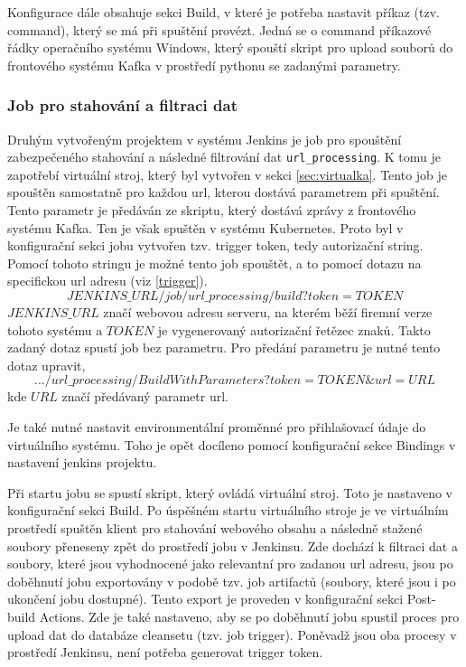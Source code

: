 \documentclass[thesis=M,czech,hidelinks]{FITthesis}[2013/05/06]
\begin{document}
Konfigurace dále obsahuje sekci Build, v které je potřeba nastavit příkaz (tzv. command), který se má při spuštění provézt. Jedná se o command příkazové řádky operačního systému Windows, který spouští skript pro upload souborů do frontového systému Kafka v prostředí pythonu se zadanými parametry.



\subsubsection{Job pro stahování a filtraci dat} \label{sec:jenkinsvirt}
Druhým vytvořeným projektem v systému Jenkins je job pro spouštění zabezpečeného stahování a následné filtrování dat \texttt{url_processing}. K tomu je zapotřebí virtuální stroj, který byl vytvořen v sekci \ref{sec:virtualka}. Tento job je spouštěn samostatně pro každou url, kterou dostává parametrem při spuštění. Tento parametr je předáván ze skriptu, který dostává zprávy z frontového systému Kafka. Ten je však spuštěn v systému Kubernetes. Proto byl v konfigurační sekci jobu vytvořen tzv. trigger token, tedy autorizační string. Pomocí tohoto stringu je možné tento job spouštět, a to pomocí dotazu na specifickou url adresu (viz \ref{trigger}).
\begin{equation} \label{trigger}
JENKINS\_URL/job/url\_processing/build?token=TOKEN
\end{equation}
$JENKINS\_URL$ značí webovou adresu serveru, na kterém běží firemní verze tohoto systému a $TOKEN$ je vygenerovaný autorizační řetězec znaků. Takto zadaný dotaz spustí job bez parametru. Pro předání parametru je nutné tento dotaz upravit,
\begin{equation}
.../url\_processing/BuildWithParameters?token=TOKEN\&url=URL
\end{equation}
kde $URL$ značí předávaný parametr url.

Je také nutné nastavit environmentální proměnné pro přihlašovací údaje do virtuálního systému. Toho je opět docíleno pomocí konfigurační sekce Bindings v nastavení jenkins projektu. 

Při startu jobu se spustí skript, který ovládá virtuální stroj. Toto je nastaveno v konfigurační sekci Build. Po úspěšném startu virtuálního stroje je ve virtuálním prostředí spuštěn klient pro stahování webového obsahu a následně stažené soubory přeneseny zpět do prostředí jobu v Jenkinsu. Zde dochází k filtraci dat a soubory, které jsou vyhodnocené jako relevantní pro zadanou url adresu, jsou po doběhnutí jobu exportovány v podobě tzv. job artifactů (soubory, které jsou i po ukončení jobu dostupné). Tento export je proveden v konfigurační sekci Post-build Actions. Zde je také nastaveno, aby se po doběhnutí jobu spustil proces pro upload dat do databáze cleansetu (tzv. job trigger). Poněvadž jsou oba procesy v prostředí Jenkinsu, není potřeba generovat trigger token.
\end{document}
